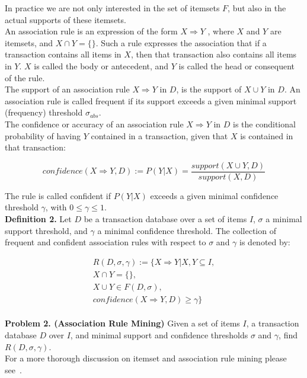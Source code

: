 \documentclass{article}
\begin{document}
In practice we are not only interested in the set of itemsets $F$, but also
in the actual supports of these itemsets.\\

An association rule is an expression of the form $X \Rightarrow Y$ ,
where $X$ and $Y$ are itemsets, and $X \cap Y = \{\}$. Such a rule
expresses the association that if a transaction contains all items in
$X$, then that transaction also contains all items in $Y$. $X$ is called
the body or antecedent, and $Y$ is called the head or consequent of the
rule.\\

The support of an association rule $X \Rightarrow Y$ in $D$, is the
support of $X \cup Y$ in $D$. An association rule is called
frequent if its support exceeds a given minimal support
(frequency) threshold $\sigma_{abs}$. \\

The confidence or accuracy of an association rule $X \Rightarrow Y$ in
$D$ is the conditional probability of having $Y$ contained in a
transaction, given that $X$ is contained in that transaction:

\[confidence(X \Rightarrow Y, D) := P(Y|X) = \frac{support(X \cup Y, D)}{support(X,D)}\]

The rule is called confident if $P(Y|X)$ exceeds a given minimal confidence threshold $\gamma$, with $0 \le \gamma \le 1$. \\

{\bf Definition 2.} Let $D$ be a transaction database over a set of items $I$, $\sigma$ a minimal support threshold, and $\gamma$ a minimal confidence threshold. The collection of frequent and confident association rules with respect to $\sigma$ and $\gamma$ is denoted by:

\begin{align*}
R(D, \sigma, \gamma) := \{X \Rightarrow Y | X, Y \subseteq I, \\
X \cap Y = \{\}, \\X \cup Y \in F(D, \sigma),\\ confidence(X \Rightarrow Y, D) \ge \gamma\}
\end{align*}\\


{\bf Problem 2. (Association Rule Mining)} Given a set of items $I$, a transaction database $D$ over $I$, and minimal support and confidence thresholds $\sigma$ and $\gamma$, find $R(D, \sigma, \gamma)$. \\

For a more thorough discussion on itemset and association rule mining please see~\cite{report:patternmining}.\\
\end{document}

